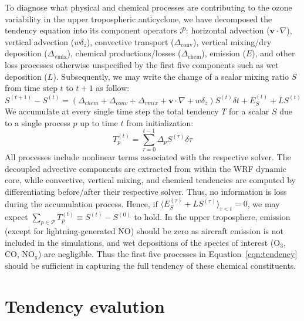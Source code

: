 To diagnose what physical and chemical processes are contributing to the ozone variability in
the upper tropospheric anticyclone, we have decomposed the tendency equation into its
component operators $\mathcal{P}$: horizontal advection ($\mathbf{v}\cdot\nabla$), vertical advection ($w\delta_z$),
convective transport ($\Delta_{\mathrm{conv}}$), vertical mixing/dry deposition ($\Delta_{\mathrm{vmix}}$),
chemical productions/losses ($\Delta_{\mathrm{chem}}$), emission ($E$), and other loss
processes otherwise unspecified by the first five components such as wet deposition ($L$).
Subsequently, we may write the change of a scalar mixing ratio $S$ from time step $t$ to $t+1$
as follow:
\begin{equation}\label{eqn:fulltendency}
S^{(t+1)}-S^{(t)} = (\Delta_{chem}+\Delta_{conv}+\Delta_{vmix}+
\mathbf{v}\cdot\nabla+w\delta_z)S^{(t)}\delta t + E_S^{(t)}+LS^{(t)}
\end{equation}
We accumulate at every single time step the total tendency $T$ for a scalar $S$ due to a single process $p$ up
to time $t$ from initialization:
\begin{equation}\label{eqn:tendency}
T_p^{(t)}=\sum_{\tau=0}^{t-1}\Delta_pS^{(\tau)}\delta\tau
\end{equation}
All processes include nonlinear terms associated with the respective solver. The decoupled advective
components are extracted from within the WRF dynamic core, while convective, vertical mixing, and chemical
tendencies are computed by differentiating before/after their respective solver. Thus,
no information is loss during the accumulation process. Hence, if
$\langle E_S^{(\tau)}+LS^{(\tau)}\rangle_{\tau<t}=0$,
we may expect $\sum_{p\in\mathcal{P}}T_p^{(t)}\equiv S^{(t)}-S^{(0)}$ to hold.
In the upper troposphere, emission (except for lightning-generated NO) should be zero as aircraft
emission is not included in the simulations, and wet depositions of the species of interest (O$_3$, CO,
$\mathrm{NO_x}$) are negligible. Thus the first five processes in Equation~\ref{eqn:tendency}
should be sufficient in capturing the full tendency of these chemical constituents.

\section{Tendency evalution}\label{sect:tendency}

